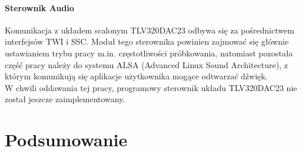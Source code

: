 \documentclass[a4paper,12pt]{book}
\begin{document}
				\subsubsection{Sterownik Audio}
					Komunikacja z układem scalonym TLV320DAC23 odbywa się za pośrednictwem interfejsów TWI i SSC. Moduł tego sterownika powinien zajmować się głównie ustawianiem trybu pracy m.in. częstotliwości próbkowania, natomiast pozostała część pracy należy do systemu ALSA (Advanced Linux Sound Architecture), z którym komunikują się aplikacje użytkownika mogące odtwarzać dźwięk.\\
					W chwili oddawania tej pracy, programowy sterownik układu TLV320DAC23 nie został jeszcze zaimplementowany.
		
	\chapter{Podsumowanie}

	
	
	
	
	
	\appendix
	
\end{document}
